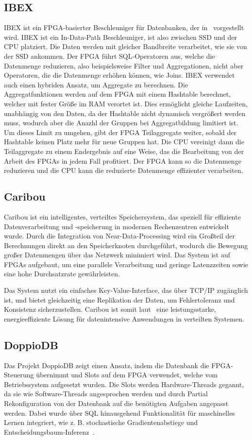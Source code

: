 \documentclass[conference]{IEEEtran}
\begin{document}
\subsection{IBEX}
IBEX ist ein FPGA-basierter Beschleuniger für Datenbanken, der in~\cite{istvan_glass_2019} vorgestellt wird. IBEX ist ein In-Data-Path Beschleuniger,
ist also zwischen SSD und der CPU platziert. Die Daten werden mit gleicher Bandbreite verarbeitet, wie sie von der SSD
ankommen. Der FPGA führt SQL-Operatoren aus, welche die Datenmenge reduzieren, also beispielsweise Filter und Aggregationen, nicht aber Operatoren,
die die Datenmenge erhöhen können, wie Joins. IBEX verwendet auch einen hybriden Ansatz, um Aggregate zu berechnen. Die Aggregatfunktionen werden auf dem FPGA
mit einem Hashtable berechnet, welcher mit fester Größe im RAM verortet ist. Dies ermöglicht gleiche Laufzeiten, unabhängig von den Daten, da der Hashtable nicht
dynamisch vergrößert werden muss, wodurch aber die Anazhl der Gruppen bei Aggregatbildung limitiert ist. Um dieses Limit zu umgehen, gibt der FPGA Teilaggregate
weiter, sobald der Hashtable keinen Platz mehr für neue Gruppen hat. Die CPU vereinigt dann die Teilaggregate zu einem Endergebnis auf eine Weise, das die Bearbeitung
von der Arbeit des FPGAs in jedem Fall profitiert. Der FPGA kann so die Datenmenge reduzieren und die CPU kann die reduzierte Datenmenge effizienter verarbeiten.

\subsection{Caribou}
Caribou ist ein intelligentes, verteiltes Speichersystem, das speziell für effiziente Datenverarbeitung und -speicherung in modernen Rechenzentren entwickelt wurde.
Durch die Integration von Near-Data-Processing wird ein Großteil der Berechnungen direkt an den Speicherknoten durchgeführt, wodurch die Bewegung großer Datenmengen
über das Netzwerk minimiert wird. Das System ist auf FPGAs aufgebaut, um eine parallele Verarbeitung und geringe
Latenzzeiten sowie eine hohe Durchsatzrate gewährleisten.

Das System nutzt ein einfaches Key-Value-Interface, das über TCP/IP zugänglich ist, und bietet gleichzeitig eine Replikation der Daten, um Fehlertoleranz
und Konsistenz sicherzustellen. Caribou ist somit laut~\cite{istvan_caribou_2017}
eine leistungsstarke, energieeffiziente Lösung für datenintensive Anwendungen in verteilten Systemen.

\subsection{DoppioDB}
Das Projekt DoppioDB zeigt einen Ansatz, indem die Datenbank die FPGA-Steuerung
übernimmt und Slots auf dem FPGA verwendet, welche vom Betriebssystem aufgesetzt wurden.
Die Slots werden Hardware-Threads gegannt, da sie wie Software-Threads angesprochen werden und durch Partial Rekonfiguration von der Datenbank auf die benötigten Aufgaben
angepasst werden. Dabei wurde über SQL hinausgehend Funktionalität für maschinelles Lernen integriert, wie z. B.
stochastische Gradientenabstiege und Entscheidungsbaum-Inferenz~\cite{istvan_glass_2019}.
\end{document}
